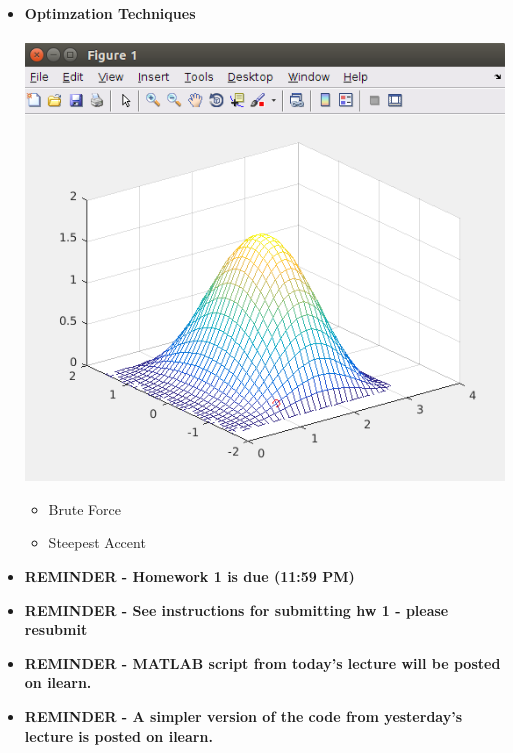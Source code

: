 \documentclass[11pt]{article}
\begin{document}
\begin{itemize}
	\item \textbf{\LARGE Optimzation Techniques}\\\\
		\includegraphics[scale=1]{lecture4_fig1.png}
		\begin{itemize}
			\item Brute Force \vspace{30mm}
			\item Steepest Accent	
		\end{itemize}
		\newpage


\newpage 

	\item \textbf{ \LARGE REMINDER - Homework 1 is due (11:59 PM) } \\
	
	\item \textbf{ \LARGE REMINDER - See instructions for submitting hw 1 - please resubmit} \\	
	 
	\item \textbf{ \LARGE REMINDER - MATLAB script from today's lecture will be posted on ilearn. } \\
		
	\item \textbf{ \LARGE REMINDER - A simpler version of the code from yesterday's lecture is posted on ilearn. } \\	

\end{itemize}


	
\end{document}
